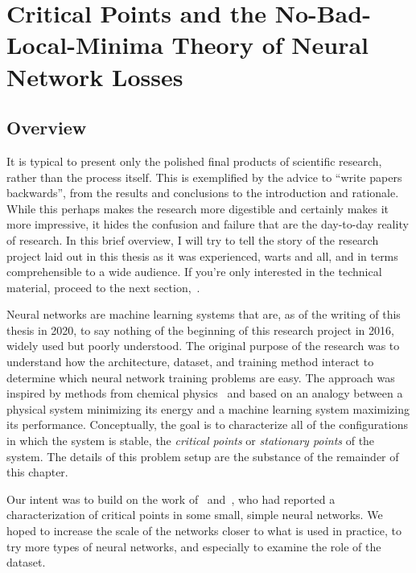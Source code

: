 \documentclass[../../thesis.tex]{subfiles}
\begin{document}
\chapter{Critical Points and the No-Bad-Local-Minima Theory of Neural Network Losses}
\onlyinsubfile{\begin{KeepFromToc}
		\tableofcontents
		\clearpage
		\listoffigures
		\listoftables
	\end{KeepFromToc}}
\onlyinsubfile{\clearpage}

\section{Overview}

It is typical to present only the polished final
products of scientific research,
rather than the process itself.
This is exemplified by the advice to
\enquote{write papers backwards},
from the results and conclusions to the introduction and rationale.
While this perhaps makes the research more digestible and
certainly makes it more impressive,
it hides the confusion and failure
that are the day-to-day reality of research.
In this brief overview,
I will try to tell the story of the research project
laid out in this thesis as it was experienced,
warts and all,
and in terms comprehensible to a wide audience.
If you're only interested in the technical material,
proceed to the next section,~.

Neural networks are machine learning systems
that are, as of the writing of this thesis in 2020,
to say nothing of the beginning of this research project in 2016,
widely used but poorly understood.
The original purpose of the research was to
understand how the
architecture, dataset, and training method
interact to determine which neural network training problems
are easy.
The approach was inspired by methods from chemical physics~\cite{ballard2017}
and based on an analogy between a physical system minimizing its energy
and a machine learning system maximizing its performance.
Conceptually, the goal is to characterize all of the configurations
in which the system is stable,
the \emph{critical points} or \emph{stationary points}
of the system.
The details of this problem setup are the substance
of the remainder of this chapter.

Our intent was to build on the work
of~\cite{dauphin2014} and~\cite{pennington2017},
who had reported a characterization of critical points in
some small, simple neural networks.
We hoped to increase the scale of the networks
closer to what is used in practice,
to try more types of neural networks,
and especially to examine the role of the dataset.
\end{document}
